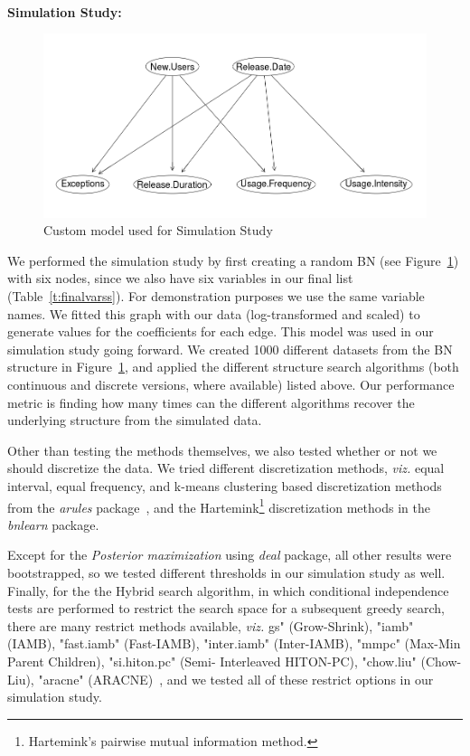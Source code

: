 \documentclass[smallextended]{svjour3}       %
\begin{document}
\noindent\\
\textbf{Simulation Study:}\\
\begin{figure}
\centering
\includegraphics[width=0.65\linewidth]{custom}
\caption{Custom model used for Simulation Study}
\label{fig:theory}
\vspace{-15pt}
\end{figure}
We performed the simulation study by first creating 
a random BN (see Figure~\ref{fig:theory}) with 
six nodes, since we also have six variables in our final list (Table~\ref{t:finalvarss}).
For demonstration purposes  we use the same variable names. 
We fitted this graph with our data (log-transformed and scaled) to generate values for the coefficients 
for each edge. This model was used in our simulation study going forward.
We created 1000 different datasets from the BN structure in Figure~\ref{fig:theory},
and applied the different structure search algorithms 
(both continuous and discrete versions, where available) listed above. Our performance metric
is finding how many times can the different algorithms recover the 
underlying structure from the simulated data. 

Other than testing the methods  themselves, we also tested whether or not we should 
discretize the data. We tried different discretization methods, \textit{viz.} 
equal interval, equal frequency, and
k-means clustering based discretization methods from the
\textit{arules} package~\cite{arulesR}, and the 
Hartemink\footnote{Hartemink's pairwise mutual information 
method\cite{hartemink2001principled}.} discretization methods 
in the \textit{bnlearn} package.

Except for the \textit{Posterior maximization} using \textit{deal} package, 
all other results were bootstrapped, so we tested different thresholds in our 
simulation study as well. Finally, for the the Hybrid search algorithm, in which
conditional independence tests are performed to restrict
the search space for a subsequent greedy search, there are many restrict methods
available, \textit{viz.} gs" (Grow-Shrink), "iamb" (IAMB), "fast.iamb" (Fast-IAMB), "inter.iamb" (Inter-IAMB), "mmpc" (Max-Min Parent Children), "si.hiton.pc" (Semi- Interleaved HITON-PC), "chow.liu" (Chow-Liu), "aracne" (ARACNE)~\cite{bnlearnR}, and we tested all of these restrict options 
in our simulation study. 
\end{document}
